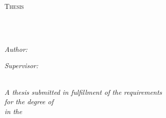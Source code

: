 \documentclass[
10pt, %
twoside, %
chapterinoneline,%
onehalfspacing, %
nolistspacing, %
parskip, %
headsepline, %
english,
]{MastersDoctoralThesis} %
\author{Author} %
\date{\today} %
\begin{document}
\frontmatter %

\pagestyle{plain} %


\begin{titlepage}
	
	\begin{center}
		
		{\scshape\LARGE \univname\par}\vspace{1.5cm} %
		\textsc{\Large Thesis}\\[0.5cm] %
		
		\HRule \\[0.4cm] %
		{\huge \bfseries \ttitle\par}\vspace{0.4cm} %
		\HRule \\[1.5cm] %
		
		\begin{minipage}[htbp]{0.4\textwidth}
			
			\begin{flushleft} \large
				\emph{Author:}\\
				\authorname %
			\end{flushleft}
			
		\end{minipage}
		\hfill
		\begin{minipage}[htbp]{0.4\textwidth}
			
			\begin{flushright}\large
				
				\emph{Supervisor:} \\
				\supname %
				 
			\end{flushright}
			
		\end{minipage}\\[3cm]
		
		\large \textit{A thesis submitted in fulfillment of the requirements\\ for the degree of \degreename}\\[0.3cm] %
		\textit{in the}\\[0.4cm]
		\groupname\\\deptname\\[2cm] %
		

\end{center}
\end{titlepage}
\end{document}
